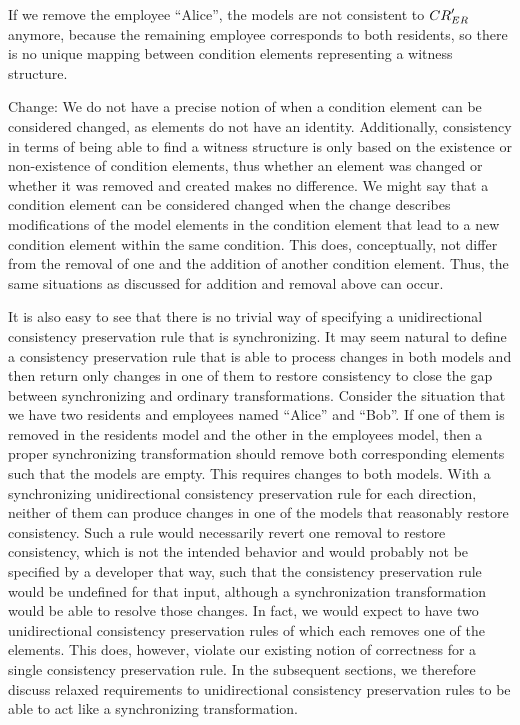 \begin{properdescription}
    If we remove the employee \enquote{Alice}, the models are not consistent to $\consistencyrelation{CR}{ER}'$ anymore, because the remaining employee corresponds to both residents, so there is no unique mapping between condition elements representing a witness structure.
    \item[Change:] We do not have a precise notion of when a condition element can be considered changed, as elements do not have an identity. 
    Additionally, consistency in terms of being able to find a witness structure is only based on the existence or non-existence of condition elements, thus whether an element was changed or whether it was removed and created makes no difference.
    We might say that a condition element can be considered changed when the change describes modifications of the model elements in the condition element that lead to a new condition element within the same condition.
    This does, conceptually, not differ from the removal of one and the addition of another condition element.
    Thus, the same situations as discussed for addition and removal above can occur.
\end{properdescription}

It is also easy to see that there is no trivial way of specifying a unidirectional consistency preservation rule that is synchronizing.
It may seem natural to define a consistency preservation rule that is able to process changes in both models and then return only changes in one of them to restore consistency to close the gap between synchronizing and ordinary transformations.
Consider the situation that we have two residents and employees named \enquote{Alice} and \enquote{Bob}.
If one of them is removed in the residents model and the other in the employees model, then a proper synchronizing transformation should remove both corresponding elements such that the models are empty.
This requires changes to both models.
With a synchronizing unidirectional consistency preservation rule for each direction, neither of them can produce changes in one of the models that reasonably restore consistency.
Such a rule would necessarily revert one removal to restore consistency, which is not the intended behavior and would probably not be specified by a developer that way, such that the consistency preservation rule would be undefined for that input, although a synchronization transformation would be able to resolve those changes.
In fact, we would expect to have two unidirectional consistency preservation rules of which each removes one of the elements.
This does, however, violate our existing notion of correctness for a single consistency preservation rule.
In the subsequent sections, we therefore discuss relaxed requirements to unidirectional consistency preservation rules to be able to act like a synchronizing transformation.

